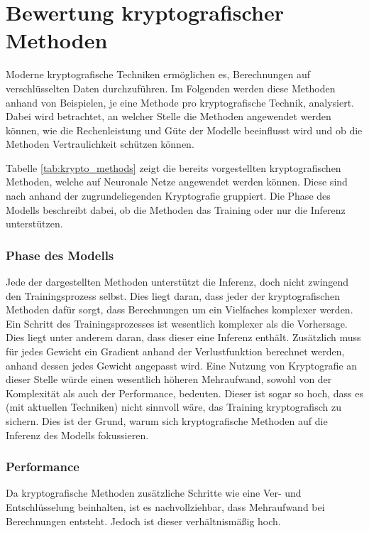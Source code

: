 \section{Bewertung kryptografischer Methoden}\label{sec:bw_krypto}

Moderne kryptografische Techniken ermöglichen es, Berechnungen auf verschlüsselten Daten durchzuführen.
Im Folgenden werden diese Methoden anhand von Beispielen, je eine Methode pro kryptografische Technik, analysiert.
Dabei wird betrachtet, an welcher Stelle die Methoden angewendet werden können, wie die Rechenleistung und Güte der Modelle beeinflusst wird und ob die Methoden Vertraulichkeit schützen können.

Tabelle \ref{tab:krypto_methods} zeigt die bereits vorgestellten kryptografischen Methoden, welche auf Neuronale Netze angewendet werden können.
Diese sind nach anhand der zugrundeliegenden Kryptografie gruppiert.
Die Phase des Modells beschreibt dabei, ob die Methoden das Training oder nur die Inferenz unterstützen.




\subsubsection*{Phase des Modells}

Jede der dargestellten Methoden unterstützt die Inferenz, doch nicht zwingend den Trainingsprozess selbst.
Dies liegt daran, dass jeder der kryptografischen Methoden dafür sorgt, dass Berechnungen um ein Vielfaches komplexer werden. 
Ein Schritt des Trainingsprozesses ist wesentlich komplexer als die Vorhersage. 
Dies liegt unter anderem daran, dass dieser eine Inferenz enthält.
Zusätzlich muss für jedes Gewicht ein Gradient anhand der Verlustfunktion berechnet werden, anhand dessen jedes Gewicht angepasst wird.
Eine Nutzung von Kryptografie an dieser Stelle würde einen wesentlich höheren Mehraufwand, sowohl von der Komplexität als auch der Performance, bedeuten.
Dieser ist sogar so hoch, dass es (mit aktuellen Techniken) nicht sinnvoll wäre, das Training kryptografisch zu sichern.
Dies ist der Grund, warum sich kryptografische Methoden auf die Inferenz des Modells fokussieren.

\subsubsection*{Performance}

Da kryptografische Methoden zusätzliche Schritte wie eine Ver- und Entschlüsselung beinhalten, ist es nachvollziehbar, dass Mehraufwand bei Berechnungen entsteht.
Jedoch ist dieser verhältnismäßig hoch.

